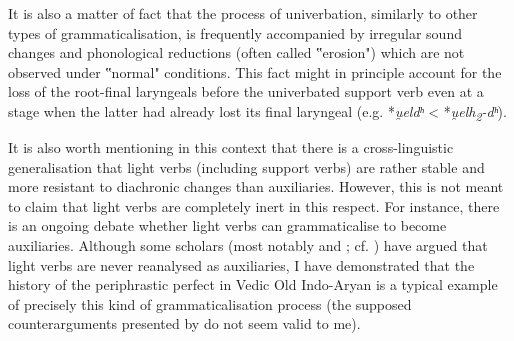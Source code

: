 \documentclass[output=paper,colorlinks,citecolor=brown]{langscibook}
\begin{document}
It is also a matter of fact that the process of univerbation, similarly to other types of grammaticalisation, is frequently accompanied by irregular sound changes and phonological reductions (often called ‟erosion") which are not observed under ‟normal" conditions. This fact might in principle account for the loss of the root-final laryngeals before the univerbated support verb even at a stage when the latter had already lost its final laryngeal (e.g. *\textit{u̯eldʰ} < *\textit{u̯elh\textsubscript{2}-dʰ}).

It is also worth mentioning in this context that there is a cross-linguistic generalisation that light verbs (including support verbs) are rather stable and more resistant to diachronic changes than auxiliaries. However, this is not meant to claim that light verbs are completely inert in this respect. For instance, there is an ongoing debate whether light verbs can grammaticalise to become auxiliaries. Although some scholars (most notably \citealt{Butt2010} and \citealt{ButtLahiri2013}; cf. \citealt[174]{Bowern2008}) have argued that light verbs are never reanalysed as auxiliaries, I have demonstrated \citep{Ittzés2020/2021} that the history of the periphrastic perfect in Vedic Old Indo-Aryan is a typical example of precisely this kind of grammaticalisation process (the supposed counterarguments presented by \citealt{ButtLahiri2023} do not seem valid to me).
\end{document}

